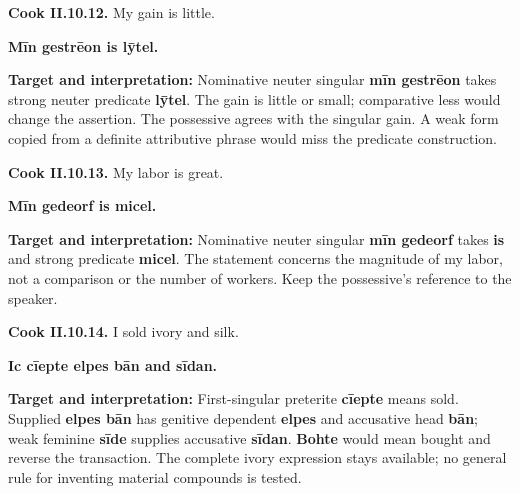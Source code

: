 \par\begin{minipage}{\linewidth}\raggedright
\textbf{Cook II.10.12.} My gain is little.

\textbf{Mīn gestrēon is lȳtel.}

\textbf{Target and interpretation:} Nominative neuter singular \textbf{mīn gestrēon} takes strong neuter predicate \textbf{lȳtel}. The gain is little or small; comparative less would change the assertion. The possessive agrees with the singular gain. A weak form copied from a definite attributive phrase would miss the predicate construction.

\end{minipage}\par\addvspace{4pt}

\par\begin{minipage}{\linewidth}\raggedright
\textbf{Cook II.10.13.} My labor is great.

\textbf{Mīn gedeorf is micel.}

\textbf{Target and interpretation:} Nominative neuter singular \textbf{mīn gedeorf} takes \textbf{is} and strong predicate \textbf{micel}. The statement concerns the magnitude of my labor, not a comparison or the number of workers. Keep the possessive's reference to the speaker.

\end{minipage}\par\addvspace{4pt}

\par\begin{minipage}{\linewidth}\raggedright
\textbf{Cook II.10.14.} I sold ivory and silk.

\textbf{Ic cīepte elpes bān and sīdan.}

\textbf{Target and interpretation:} First-singular preterite \textbf{cīepte} means sold. Supplied \textbf{elpes bān} has genitive dependent \textbf{elpes} and accusative head \textbf{bān}; weak feminine \textbf{sīde} supplies accusative \textbf{sīdan}. \textbf{Bohte} would mean bought and reverse the transaction. The complete ivory expression stays available; no general rule for inventing material compounds is tested.

\end{minipage}\par\addvspace{4pt}

